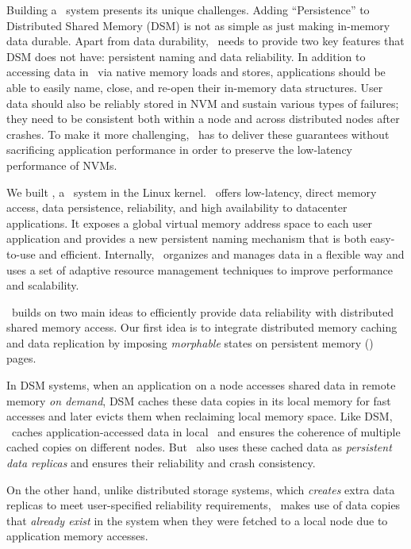 Building a \dsnvm\ system presents its unique challenges.
Adding ``Persistence'' to Distributed Shared Memory (DSM)
is not as simple as just making in-memory data durable.
Apart from data durability, \dsnvm\ needs to provide two key features that DSM does not have:
persistent naming and data reliability.
In addition to accessing data in \nvm\ via native memory loads and stores,
applications should be able to easily
name, close, and re-open their in-memory data structures.
User data should also be reliably stored in NVM and sustain various types of failures; %
they need to be consistent both within a node and across distributed nodes after crashes.
To make it more challenging, 
\dsnvm\ has to deliver these guarantees without sacrificing application performance
in order to preserve the low-latency performance of NVMs.

We built {\em \hotpot}, a \dsnvm\ system in the Linux kernel.
\hotpot\ offers low-latency, direct memory access, data persistence, reliability, and
high availability to datacenter applications.
It exposes a global virtual memory address space to each user application
and provides a new persistent naming mechanism that is both easy-to-use and efficient.
Internally, \hotpot\ organizes and manages data in a flexible way
and uses a set of adaptive resource management techniques to improve performance and scalability.

\hotpot\ builds on two main ideas to efficiently provide data reliability with distributed shared memory access.
Our first idea is to integrate distributed memory caching and data replication 
by imposing {\em morphable} states on persistent memory ({\em \nvm}) pages.

In DSM systems, when an application on a node accesses shared data in remote memory {\em on demand},
DSM caches these data copies in its local memory for fast accesses
and later evicts them when reclaiming local memory space.
Like DSM, \hotpot\ caches application-accessed data in local \nvm\
and ensures the coherence of multiple cached copies on different nodes.
But \hotpot\ also uses these cached data as {\em persistent data replicas}
and ensures their reliability and crash consistency.

On the other hand, unlike distributed storage systems, which {\em creates} extra data replicas 
to meet user-specified reliability requirements, 
\hotpot\ makes use of data copies that {\em already exist} in the system when
they were fetched to a local node due to application memory accesses.
 
